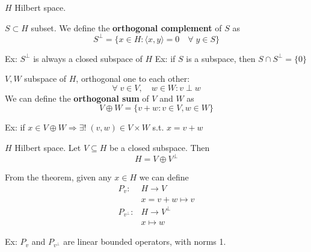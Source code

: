 \(H\) Hilbert space. 
\begin{definition}
    \(S \subset H\) subset. We define the \textbf{orthogonal complement} of \(S\) as 
    \[
        S^\perp = \{ x \in H:  \langle x, y\rangle = 0 \quad \forall\; y \in S\}
    \]
\end{definition}
Ex: \(S^\perp \) is always a closed subspace of \(H\)
Ex: if \(S\) is a subspace, then \(S \cap S^\perp = \{0\}\)

\begin{definition}
    \(V, W\) subspace of \(H\), orthogonal one to each other:
    \[
        \forall \; v \in V, \quad w \in W: v \perp w
    \]
    We can define the \textbf{orthogonal sum} of \(V\) and \(W\) as 
    \[
        V \oplus W = \{ v+w : v \in V, w \in W \}
    \]
\end{definition}
Ex: if \(x \in V \oplus W \Rightarrow \exists! \; (v, w) \in V \times W\) s.t. \(x=v+w\)

\begin{theorem}
    \(H\) Hilbert space. Let \(V \subseteq H\) be a closed subspace. Then 
    \[
        H = V \oplus V^\perp
    \]
\end{theorem}

\begin{definition}
    From the theorem, given any \(x \in H\) we can define
    \[
        \begin{array}{rl}
            P_v: & H \to V \\
            & x = v + w \mapsto v \\ \tag*{orthogonal projections}
            P_{v^\perp} : & H \to V^\perp \\
            & x \mapsto w
        \end{array}
    \]
\end{definition}
Ex: \(P_v \) and \(P_{v^\perp}\) are linear bounded operators, with norms 1.